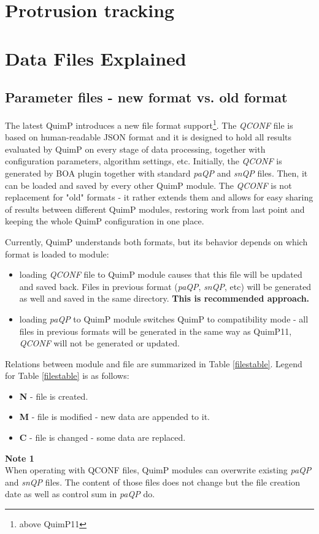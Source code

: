 \documentclass[a4paper,12pt]{article}
\begin{document}
\section{Protrusion tracking}
\label{sec:PtrotTracking}

 
\section{Data Files Explained}

\subsection{Parameter files - new format vs. old format}
The latest QuimP introduces a new file format support\footnote{above QuimP11}. The \textit{QCONF} file is based on human-readable JSON format and it is designed to hold all results evaluated by QuimP on every stage of data processing, together with configuration parameters, algorithm settings, etc. 
Initially, the \textit{QCONF} is generated by BOA plugin together with standard \textit{paQP} and \textit{snQP} files. Then, it can be loaded and saved by every other QuimP module. The \textit{QCONF} is not replacement for "old" formats - it rather extends them and allows for easy sharing of results between different QuimP modules, restoring work from last point and keeping the whole QuimP configuration in one place.   

Currently, QuimP understands both formats, but its behavior depends on which format is loaded to module:
\begin{itemize}
	\item loading \textit{QCONF} file to QuimP module causes that this file will be updated and saved back. Files in previous format (\textit{paQP}, \textit{snQP}, etc) will be generated as well and saved in the same directory. \textbf{This is recommended approach.}
	\item loading \textit{paQP} to QuimP module switches QuimP to compatibility mode - all files in previous formats will be generated in the same way as QuimP11, \textit{QCONF} will not be generated or updated. 
\end{itemize}     
Relations between module and file are summarized in Table \ref{filestable}. Legend for Table \ref{filestable} is as follows:
\begin{itemize}
	\item \textbf{N} - file is created.
	\item \textbf{M} - file is modified - new data are appended to it.
	\item \textbf{C} - file is changed - some data are replaced.
\end{itemize}
\textbf{Note 1} \\
When operating with QCONF files, QuimP modules can overwrite existing \textit{paQP} and \textit{snQP} files. The content of those files does not change but the file creation date as well as control sum in \textit{paQP} do.
\end{document}
